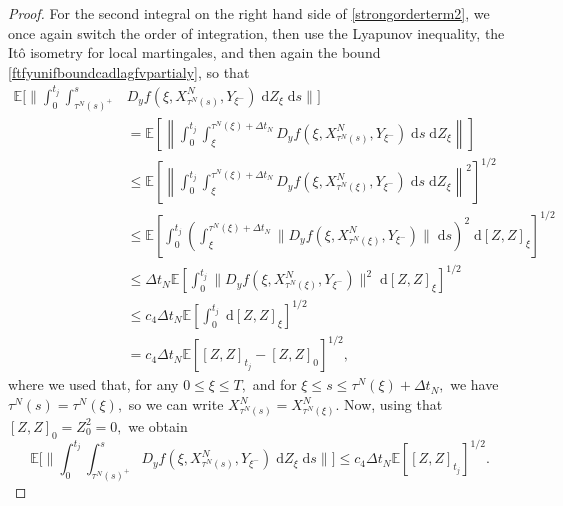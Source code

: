 \documentclass[reqno,12pt]{amsart}
\theoremstyle{plain} %
\theoremstyle{definition} %
\begin{document}
\begin{proof}
    For the second integral on the right hand side of \cref{strongorderterm2}, we once again switch the order of integration, then use the Lyapunov inequality, the It\^o isometry for local martingales, and then again the bound \cref{ftfyunifboundcadlagfvpartialy}, so that
    \begin{align*}
        \mathbb{E}\bigg[\bigg\|\int_0^{t_j} \int_{\tau^N(s)^+}^s & D_y f(\xi, X_{\tau^N(s)}^N, Y_{\xi^-}) \;\mathrm{d}Z_\xi\;\mathrm{d}s\bigg\|\bigg] \\
        & = \mathbb{E}\left[\left\|\int_0^{t_j} \int_{\xi}^{\tau^N(\xi) + \Delta t_N} D_y f(\xi, X_{\tau^N(s)}^N, Y_{\xi^-}) \;\mathrm{d}s \;\mathrm{d}Z_\xi\right\|\right] \\
        & \leq \mathbb{E}\left[\left\|\int_0^{t_j} \int_{\xi}^{\tau^N(\xi) + \Delta t_N} D_y f(\xi, X_{\tau^N(\xi)}^N, Y_{\xi^-}) \;\mathrm{d}s \;\mathrm{d}Z_\xi\right\|^2\right]^{1/2} \\
        & \leq \mathbb{E}\left[\int_0^{t_j} \left(\int_{\xi}^{\tau^N(\xi) + \Delta t_N} \|D_y f(\xi, X_{\tau^N(\xi)}^N, Y_{\xi^-})\| \;\mathrm{d}s\right)^2 \;\mathrm{d}[Z, Z]_\xi\right]^{1/2} \\
        & \leq \Delta t_N\mathbb{E}\left[\int_0^{t_j} \|D_y f(\xi, X_{\tau^N(\xi)}^N, Y_{\xi^-})\|^2 \;\mathrm{d}[Z, Z]_\xi\right]^{1/2} \\
        & \leq c_4\Delta t_N\mathbb{E}\left[\int_0^{t_j} \;\mathrm{d}[Z, Z]_\xi\right]^{1/2} \\
        & = c_4\Delta t_N\mathbb{E}\left[ [Z, Z]_{t_j} - [Z, Z]_0\right]^{1/2},
    \end{align*}
    where we used that, for any $0 \leq \xi \leq T,$ and for $\xi \leq s \leq \tau^N(\xi) + \Delta t_N,$ we have $\tau^N(s) = \tau^N(\xi),$ so we can write $X_{\tau^N(s)}^N = X_{\tau^N(\xi)}^N.$ Now, using that $[Z, Z]_0 = Z_0^2 = 0,$ we obtain
    \begin{equation}
        \label{strongorderterm2b}
        \mathbb{E}\bigg[\bigg\|\int_0^{t_j} \int_{\tau^N(s)^+}^s D_y f(\xi, X_{\tau^N(s)}^N, Y_{\xi^-}) \;\mathrm{d}Z_\xi\;\mathrm{d}s\bigg\|\bigg] \leq c_4\Delta t_N\mathbb{E}\left[ [Z, Z]_{t_j}\right]^{1/2}.
    \end{equation}
    

\end{proof}
\end{document}
